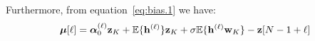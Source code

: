 Furthermore, from equation~\eqref{eq:bias.1} we have:
\begin{equation*}
\boldsymbol{\mu}[\ell] = \boldsymbol{\alpha}_0^{(\ell)}{\mathbf z}_{K} + {\mathbb E}\{{\mathbf h}^{(\ell)}\}{\mathbf z}_{K} + \sigma{\mathbb E}\{{\mathbf h}^{(\ell)}{\mathbf w}_{K}\} - {\mathbf z}[N-1+\ell]
\end{equation*}
